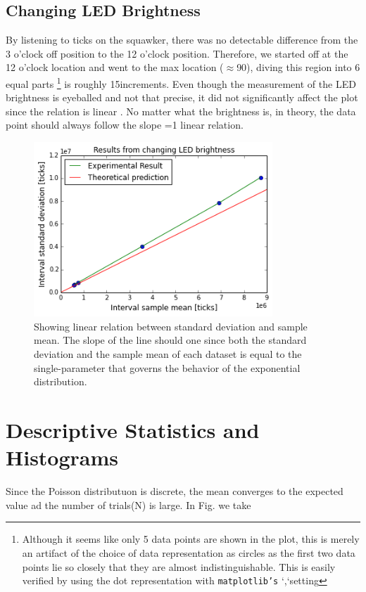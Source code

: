 \documentclass[12pt]{article}
\begin{document}
   \subsection{Changing LED Brightness}
\indent By listening to ticks on the squawker, there was no detectable difference from the 3 o'clock off position to the 12 o'clock position. Therefore, we started off at the 12 o'clock location and went to the max location ($\approx$90\degree), diving this region into 6 equal parts \footnote{Although it seems like only 5 data points are shown in the plot, this is merely an artifact of the choice of data representation as circles as  the first two data points lie so closely that they are almost indistinguishable. This is easily verified by using the dot representation with \texttt{matplotlib's} `,`setting} is roughly 15\degree  increments. Even though the measurement of the LED brightness is eyeballed and not that precise, it did not significantly affect the plot since the relation is linear . No matter what the brightness is, in theory, the data point should always follow the slope =1 linear relation.
\begin{figure}[h]
\centering
\includegraphics[width=0.8\textwidth]{figures/changeLED}
\caption{Showing linear relation between standard deviation and sample mean. The slope of the line should one since both the standard deviation and the sample mean of each dataset is equal to the single-parameter that governs the behavior of the exponential distribution.}
\label{changeLED}
\end{figure}
\section{Descriptive Statistics and Histograms\label{stats}}
Since the Poisson distributuon is discrete, the mean converges to the expected value ad the number of trials(N) is large. In Fig. we take 
\end{document}
